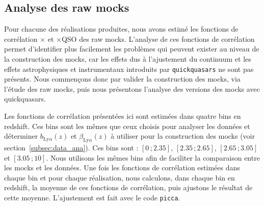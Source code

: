 \subsection{Analyse des raw mocks}
Pour chacune des \Nmocks{} réalisations produites, nous avons estimé les fonctions de corrélation \lya{}$\times$\lya{} et \lya{}$\times$QSO des raw mocks.
L'analyse de ces fonctions de corrélation permet d'identifier plus facilement les problèmes qui peuvent exister au niveau de la construction des mocks, car les effets dus à l'ajustement du continuum et les effets astrophysiques et instrumentaux introduits par \texttt{quickquasars} ne sont pas présents. Nous commençons donc par valider la construction des mocks, via l'étude des raw mocks, puis nous présentons l'analyse des versions des mocks avec quickquasars.

Les fonctions de corrélation présentées ici sont estimées dans quatre bins en redshift. Ces bins sont les mêmes que ceux choisis pour analyser les données et déterminer $b_{\mathrm{Ly}\alpha}(z)$ et $\beta_{\mathrm{Ly}\alpha}(z)$ à utiliser pour la construction des mocks (voir section~\ref{subsec:data_ana}). Ces bins sont : $[\num{0}\,;\num{2.35}]$, $[\num{2.35}\,;\num{2.65}]$, $[\num{2.65}\,;\num{3.05}]$ et $[\num{3.05}\,;\num{10}]$. Nous utilisons les mêmes bins afin de faciliter la comparaison entre les mocks et les données.
Une fois les fonctions de corrélation estimées dans chaque bin et pour chaque réalisation, nous calculons, dans chaque bin en redshift, la moyenne de ces fonctions de corrélation, puis ajustons le résultat de cette moyenne. L'ajustement est fait avec le code \texttt{picca}.

